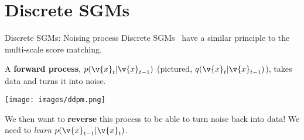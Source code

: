 



\section{Discrete SGMs}
\begin{frame}{Discrete SGMs: Noising process}
    Discrete SGMs~\cite{sohl2015deep,ho2020denoising,debortoli2021diffusion}  have a similar principle to the multi-scale score matching.
    
    A \textbf{forward process}, $p(\v{x}_t | \v{x}_{t-1})$ (pictured, $q(\v{x}_t | \v{x}_{t-1})$), takes data and turns it into noise.
    \begin{center}
        \texttt{[image: images/ddpm.png]}
    \end{center}
    \pause
    We then want to \textbf{reverse} this process to be able to turn noise back into data! We need to \textit{learn} $p(\v{x}_{t-1} | \v{x}_{t})$.

\end{frame}

